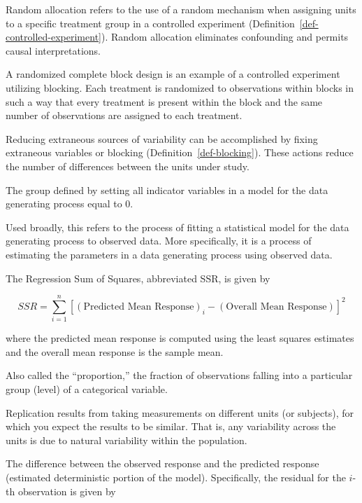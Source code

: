 \documentclass[
  letterpaper,
  DIV=11,
  numbers=noendperiod]{scrreprt}
\providecommand{\tightlist}{%
  \setlength{\itemsep}{0pt}\setlength{\parskip}{0pt}}\usepackage{longtable,booktabs,array}
\theoremstyle{plain}
\theoremstyle{definition}
\theoremstyle{definition}
\theoremstyle{remark}
\begin{document}
Random allocation refers to the use of a random mechanism when assigning
units to a specific treatment group in a controlled experiment
(Definition~\ref{def-controlled-experiment}). Random allocation
eliminates confounding and permits causal interpretations.

\begin{description}
\tightlist
\item[Randomized Complete Block Design (Definition~\ref{def-rcbd})]
A randomized complete block design is an example of a controlled
experiment utilizing blocking. Each treatment is randomized to
observations within blocks in such a way that every treatment is present
within the block and the same number of observations are assigned to
each treatment.
\item[Reduction of Noise (Definition~\ref{def-noise-reduction})]
Reducing extraneous sources of variability can be accomplished by fixing
extraneous variables or blocking (Definition~\ref{def-blocking}). These
actions reduce the number of differences between the units under study.
\item[Reference Group (Definition~\ref{def-reference-group})]
The group defined by setting all indicator variables in a model for the
data generating process equal to 0.
\item[Regression (Definition~\ref{def-regression})]
Used broadly, this refers to the process of fitting a statistical model
for the data generating process to observed data. More specifically, it
is a process of estimating the parameters in a data generating process
using observed data.
\item[Regression Sum of Squares (Definition~\ref{def-ssr})]
The Regression Sum of Squares, abbreviated SSR, is given by
\end{description}

\[SSR = \sum_{i=1}^{n} \left[(\text{Predicted Mean Response})_i - (\text{Overall Mean Response})\right]^2\]

where the predicted mean response is computed using the least squares
estimates and the overall mean response is the sample mean.

\begin{description}
\tightlist
\item[Relative Frequency (Definition~\ref{def-relative-frequency})]
Also called the ``proportion,'' the fraction of observations falling
into a particular group (level) of a categorical variable.
\item[Replication (Definition~\ref{def-replication})]
Replication results from taking measurements on different units (or
subjects), for which you expect the results to be similar. That is, any
variability across the units is due to natural variability within the
population.
\item[Residual (Definition~\ref{def-residual})]
The difference between the observed response and the predicted response
(estimated deterministic portion of the model). Specifically, the
residual for the \(i\)-th observation is given by
\end{description}
\end{document}
